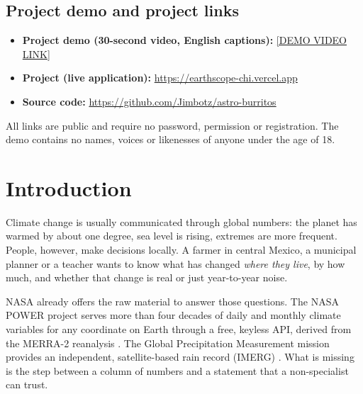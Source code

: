 \documentclass[12pt, oneside, openany]{report}
\begin{document}
\section*{Project demo and project links}

\begin{itemize}[leftmargin=*]
    \item \textbf{Project demo (30-second video, English captions):} \url{[DEMO VIDEO LINK]}
    \item \textbf{Project (live application):} \url{https://earthscope-chi.vercel.app}
    \item \textbf{Source code:} \url{https://github.com/Jimbotz/astro-burritos}
\end{itemize}

\noindent All links are public and require no password, permission or registration. The demo contains no names, voices or likenesses of anyone under the age of 18.

\tableofcontents

\clearpage
{}
\setcounter{page}{1}
\pagestyle{fancy}
\fancyhf{}
\fancyhead[R]{\small\rightmark}
\fancyfoot[C]{\thepage}

\chapter{Introduction}

Climate change is usually communicated through global numbers: the planet has warmed by about one degree, sea level is rising, extremes are more frequent. People, however, make decisions locally. A farmer in central Mexico, a municipal planner or a teacher wants to know what has changed \emph{where they live}, by how much, and whether that change is real or just year-to-year noise.

NASA already offers the raw material to answer those questions. The NASA POWER project \cite{nasapower} serves more than four decades of daily and monthly climate variables for any coordinate on Earth through a free, keyless API, derived from the MERRA-2 reanalysis \cite{gelaro2017merra2}. The Global Precipitation Measurement mission provides an independent, satellite-based rain record (IMERG) \cite{huffman2020imerg}. What is missing is the step between a column of numbers and a statement that a non-specialist can trust.
\end{document}
